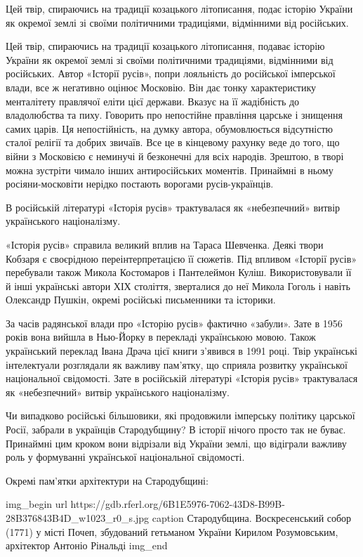 Цей твір, спираючись на традиції козацького літописання, подає історію України
як окремої землі зі своїми політичними традиціями, відмінними від російських.

Цей твір, спираючись на традиції козацького літописання, подаває історію
України як окремої землі зі своїми політичними традиціями, відмінними від
російських. Автор «Історії русів», попри лояльність до російської імперської
влади, все ж негативно оцінює Московію. Він дає тонку характеристику
менталітету правлячої еліти цієї держави. Вказує на її жадібність до
владолюбства та пиху. Говорить про непостійне правління царське і знищення
самих царів. Ця непостійність, на думку автора, обумовлюється відсутністю
сталої релігії та добрих звичаїв. Все це в кінцевому рахунку веде до того, що
війни з Московією є неминучі й безконечні для всіх народів. Зрештою, в творі
можна зустріти чимало інших антиросійських моментів. Принаймні в ньому
росіяни-московіти нерідко постають ворогами русів-українців.

В російській літературі «Історія русів» трактувалася як «небезпечний» витвір
українського націоналізму.

«Історія русів» справила великий вплив на Тараса Шевченка. Деякі твори Кобзаря
є своєрідною переінтерпретацією її сюжетів. Під впливом «Історії русів»
перебували також Микола Костомаров і Пантелеймон Куліш. Використовували її й
інші українські автори ХІХ століття, зверталися до неї Микола Гоголь і навіть
Олександр Пушкін, окремі російські письменники та історики.

За часів радянської влади про «Історію русів» фактично «забули». Зате в 1956
років вона вийшла в Нью-Йорку в перекладі українською мовою. Також український
переклад Івана Драча цієї книги з’явився в 1991 році. Твір українські
інтелектуали розглядали як важливу пам’ятку, що сприяла розвитку української
національної свідомості. Зате в російській літературі «Історія русів»
трактувалася як «небезпечний» витвір українського націоналізму.

Чи випадково російські більшовики, які продовжили імперську політику царської
Росії, забрали в українців Стародубщину? В історії нічого просто так не буває.
Принаймні цим кроком вони відрізали від України землі, що відіграли важливу
роль у формуванні української національної свідомості.

Окремі пам'ятки архітектури на Стародубщині:

\ifcmt
img_begin 
  url https://gdb.rferl.org/6B1E5976-7062-43D8-B99B-28B376843B4D_w1023_r0_s.jpg
  caption Стародубщина. Воскресенський собор (1771) у місті Почеп, збудований
  гетьманом України Кирилом Розумовським, архітектор Антоніо Рінальді
img_end
\fi

